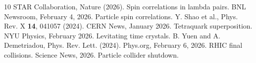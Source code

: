 \documentclass[11pt]{article}
\begin{document}

\begin{thebibliography}{10}
STAR Collaboration, Nature (2026). Spin correlations in lambda pairs.
BNL Newsroom, February 4, 2026. Particle spin correlations.
Y. Shao et al., Phys. Rev. X \textbf{14}, 041057 (2024).
CERN News, January 2026. Tetraquark superposition.
NYU Physics, February 2026. Levitating time crystals.
B. Yuen and A. Demetriadou, Phys. Rev. Lett. (2024).
Phys.org, February 6, 2026. RHIC final collisions.
Science News, 2026. Particle collider shutdown.
\end{thebibliography}
\end{document}
